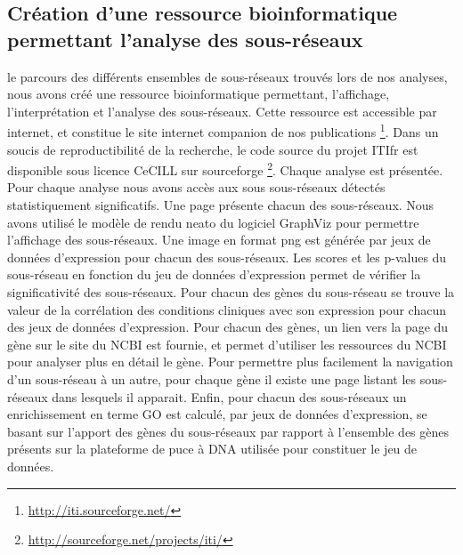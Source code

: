 		\subsection{\textcolor{green!60!black}{Création d'une ressource bioinformatique permettant l'analyse des sous-réseaux}}
			 le parcours des différents ensembles de sous-réseaux trouvés lors de nos analyses, nous avons créé une ressource bioinformatique permettant, l'affichage, l'interprétation et l'analyse des sous-réseaux.
			Cette ressource est accessible par internet, et constitue le site internet companion de nos publications \footnote{\url{http://iti.sourceforge.net/}}.
			Dans un soucis de reproductibilité de la recherche, le code source du projet \ac{ITIfr} est disponible sous licence CeCILL sur sourceforge \footnote{\url{http://sourceforge.net/projects/iti/}}.
			Chaque analyse est présentée.
			Pour chaque analyse nous avons accès aux sous sous-réseaux détectés statistiquement significatifs.
			Une page présente chacun des sous-réseaux.
			Nous avons utilisé le modèle de rendu neato du logiciel GraphViz pour permettre l'affichage des sous-réseaux.
			Une image en format png est générée par jeux de données d'expression pour chacun des sous-réseaux.
			Les scores et les p-values du sous-réseau en fonction du jeu de données d'expression permet de vérifier la significativité des sous-réseaux.
			Pour chacun des gènes du sous-réseau se trouve la valeur de la corrélation des conditions cliniques avec son expression pour chacun des jeux de données d'expression.
			Pour chacun des gènes, un lien vers la page du gène sur le site du NCBI est fournie, et permet d'utiliser les ressources du NCBI pour analyser plus en détail le gène.
			Pour permettre plus facilement la navigation d'un sous-réseau à un autre, pour chaque gène il existe une page listant les sous-réseaux dans lesquels il apparait.
			Enfin, pour chacun des sous-réseaux un enrichissement en terme GO est calculé, par jeux de données d'expression, se basant sur l'apport des gènes du sous-réseaux par rapport à l'ensemble des gènes présents sur la plateforme de puce à \acs{DNA} utilisée pour constituer le jeu de données.

